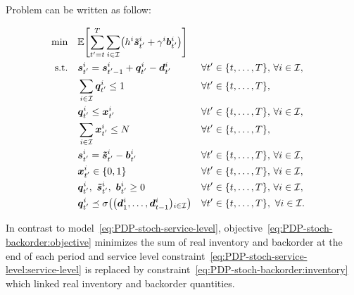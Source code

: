 Problem can be written as follow:

\begin{subequations}\label{eq:PDP-stoch-backorder}
  \begin{align}
    \min\quad & \rlap{$\ds \espe\sqbracket{\sum_{t'=t}^{\horizon} \sum_{i\in\REF} \bracket{\holding^i\va\excess_{t'}^i + \backorder^i\va\backlog_{t'}^i}}$}
    \label{eq:PDP-stoch-backorder:objective}
    \\
    \st\quad & \ds \va\inventory_{t'}^i = \va\inventory_{t'-1}^i + \va\quantity_{t'}^i - \va\demand_{t'}^i && \forall t'\in\range[t]{\horizon},\, \forall i\in\REF,
    \label{eq:PDP-stoch-backorder:inventory-dynamic}
    \\
    & \ds \sum_{i\in\REF} \va\quantity_{t'}^i \le 1 && \forall t'\in\range[t]{\horizon},
    \label{eq:PDP-stoch-backorder:capacity}
    \\
    & \ds \va\quantity_{t'}^i \le \va\setup_{t'}^i && \forall t'\in\range[t]{\horizon},\, \forall i\in\REF,
    \label{eq:PDP-stoch-backorder:big-M}
    \\
    & \ds \sum_{i\in\REF} \va\setup_{t'}^i \le \nbsetups && \forall t'\in\range[t]{\horizon},
    \label{eq:PDP-stoch-backorder:setups}
    \\
    & \ds \va\inventory_{t'}^i = \va\excess_{t'}^i - \va\backlog_{t'}^i && \forall t'\in\range[t]{\horizon},\, \forall i\in\REF,
    \label{eq:PDP-stoch-backorder:inventory}
    \\
    & \ds \va\setup_{t'}^i \in \crbracket{0,1} && \forall t'\in\range[t]{\horizon},\, \forall i\in\REF,
    \label{eq:PDP-stoch-backorder:binary}
    \\
    & \ds \va\quantity_{t'}^i,\ \va\excess_{t'}^i,\ \va\backlog_{t'}^i \ge 0 && \forall t'\in\range[t]{\horizon},\, \forall i\in\REF,
    \label{eq:PDP-stoch-backorder:positity}
    \\
    & \ds \va\quantity_{t'}^i \preceq \Sfield{\bracket{\va\demand_1^i,\ldots,\va\demand_{t-1}^i}_{i\in\REF}} && \forall t'\in\range[t]{\horizon},\ \forall i\in\REF.
    \label{eq:PDP-stoch-backorder:measurability}
  \end{align}
\end{subequations}

In contrast to model~\eqref{eq:PDP-stoch-service-level}, objective~\eqref{eq:PDP-stoch-backorder:objective} minimizes the sum of real inventory and backorder at the end of each period and service level constraint~\eqref{eq:PDP-stoch-service-level:service-level} is replaced by constraint~\eqref{eq:PDP-stoch-backorder:inventory} which linked real inventory and backorder quantities.


